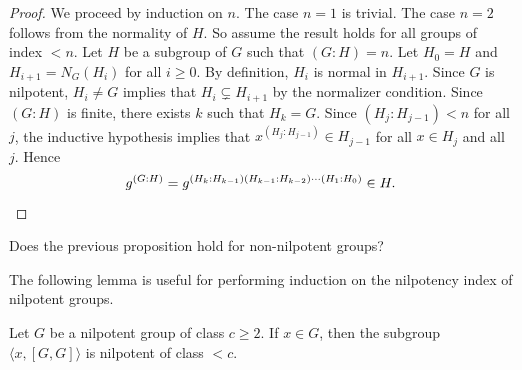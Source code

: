 \begin{proof}
We proceed by induction on $n$. The case $n=1$ is trivial. The case  
$n=2$ follows from the normality of  $H$. So assume the result 
holds for all groups of index $<n$. Let $H$ be a subgroup of $G$ such that $(G:H)=n$. 
Let $H_0=H$ and $H_{i+1}=N_G(H_i)$ for all $i\geq0$. By definition, $H_{i}$ is normal in 
$H_{i+1}$. Since $G$ is nilpotent, $H_i\ne G$
implies that $H_i\subsetneq H_{i+1}$ by the normalizer condition. 
Since $(G:H)$ is finite, there exists $k$ such that  $H_k=G$. Since
$(H_j:H_{j-1})<n$ for all $j$, the inductive hypothesis implies that 
	$x^{(H_j:H_{j-1})}\in H_{j-1}$ for all $x\in H_j$ and all $j$. Hence 
	\[
		g^{(G:H)}=g^{(H_k:H_{k-1})(H_{k-1}:H_{k-2})\cdots (H_1:H_0)}\in H.\qedhere 
	\]
\end{proof}

\begin{exercise}
\label{xca:g^n}
    Does the previous proposition hold for non-nilpotent groups? 
\end{exercise}


The following lemma is useful for performing induction 
on the nilpotency index of nilpotent groups. 

\begin{lemma}
\label{lem:a[GG]}
Let $G$ be a nilpotent group of class $c\geq2$. If $x\in G$, then 
the subgroup 
$\langle x,[G,G]\rangle$ is nilpotent of class $<c$.
\end{lemma}

